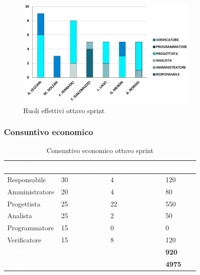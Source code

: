\begin{figure}[h!]
    \centering
    \includegraphics[width=0.8\textwidth]{cons8ruoli.png}
    \caption{Ruoli effettivi ottavo sprint}
    \label{fig:consuntivoorarioottavosprint}
\end{figure}

\newpage
\subsubsection{Consuntivo economico}
{
\setlength{\tabcolsep}{10pt}
\renewcommand{\arraystretch}{1.5}
\begin{table}[h]
    \centering
    \begin{tabularx}{\textwidth}{| l | l | l | X |}
        \hline
        \rowcolor{headerrow} \textbf{\textcolor{white}{Ruolo}} & \textbf{\textcolor{white}{Costo orario}} & \textbf{\textcolor{white}{Ore impiegate}} & \textbf{\textcolor{white}{Costo €}} \\
        \hline
        Responsabile & 30 & 4 & 120\\
        \hline
        Amministratore & 20 & 4 & 80\\
        \hline
        Progettista & 25 & 22 & 550\\
        \hline
        Analista & 25 & 2 & 50\\
        \hline
        Programmatore & 15 & 0 & 0\\
        \hline
        Verificatore & 15 & 8 & 120\\
        \hline
        \cellcolor{headerrow} \textbf{\textcolor{white}{Totale}} &  &  & \textbf{920}\\
        \hline
        \cellcolor{headerrow} \textbf{\textcolor{white}{Rimanente}} &  &  & \textbf{4975}\\
        \hline
    \end{tabularx}
    \caption{Consuntivo economico ottavo sprint}
    \label{tab:consuntivocostiottavosprint}
\end{table}
}

